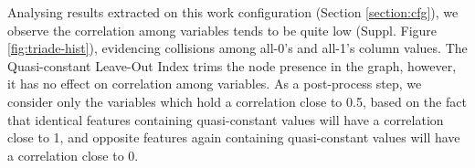 Analysing results extracted on this work configuration (Section \ref{section:cfg}), we observe the correlation among variables tends to be quite low (Suppl. Figure \ref{fig:triade-hist}), evidencing collisions among all-0's and all-1's column values. The Quasi-constant Leave-Out Index trims the node presence in the graph, however, it has no effect on correlation among variables. As a post-process step, we consider only the variables which hold a correlation close to 0.5, based on the fact that identical features containing quasi-constant values will have a correlation close to 1, and opposite features again containing quasi-constant values will have a correlation close to 0.
\\
\begin{table}[!hpt]
\centering
{}
\end{table}
